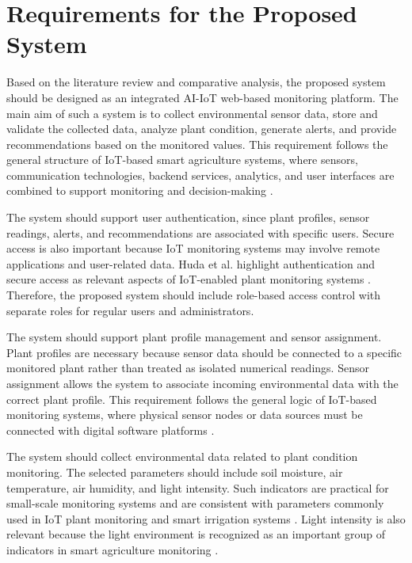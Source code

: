 \section{Requirements for the Proposed System}

Based on the literature review and comparative analysis, the proposed system should be designed as an integrated AI-IoT web-based monitoring platform. The main aim of such a system is to collect environmental sensor data, store and validate the collected data, analyze plant condition, generate alerts, and provide recommendations based on the monitored values. This requirement follows the general structure of IoT-based smart agriculture systems, where sensors, communication technologies, backend services, analytics, and user interfaces are combined to support monitoring and decision-making \cite{ahmed2024smart,mowla2023iot}.

The system should support user authentication, since plant profiles, sensor readings, alerts, and recommendations are associated with specific users. Secure access is also important because IoT monitoring systems may involve remote applications and user-related data. Huda et al. highlight authentication and secure access as relevant aspects of IoT-enabled plant monitoring systems \cite{huda2024iot}. Therefore, the proposed system should include role-based access control with separate roles for regular users and administrators.

The system should support plant profile management and sensor assignment. Plant profiles are necessary because sensor data should be connected to a specific monitored plant rather than treated as isolated numerical readings. Sensor assignment allows the system to associate incoming environmental data with the correct plant profile. This requirement follows the general logic of IoT-based monitoring systems, where physical sensor nodes or data sources must be connected with digital software platforms \cite{mowla2023iot}.

The system should collect environmental data related to plant condition monitoring. The selected parameters should include soil moisture, air temperature, air humidity, and light intensity. Such indicators are practical for small-scale monitoring systems and are consistent with parameters commonly used in IoT plant monitoring and smart irrigation systems \cite{huda2024iot,gaitan2025integrating}. Light intensity is also relevant because the light environment is recognized as an important group of indicators in smart agriculture monitoring \cite{huda2024iot,mowla2023iot}.

